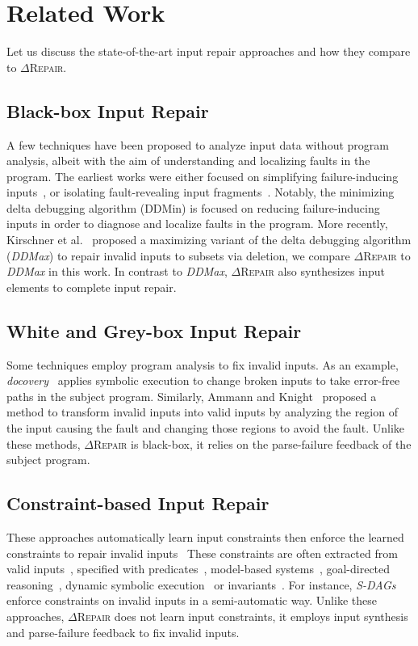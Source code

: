 \documentclass[acmsmall,screen,review,anonymous]{acmart}
\newcommand{\ddmin}{\textit{ddmin}\xspace}
\newcommand{\approach}{\textsc{$\Delta$Repair}\xspace}
\def\ddmin{DDMin\xspace}
\newcommand{\ddmax}{\textit{DDMax}\xspace}
\begin{document}
\section{Related Work}
\label{sec:relatedwork}

Let us discuss the state-of-the-art input repair approaches and how they compare to \approach. 

\subsection{Black-box Input Repair} 
A few techniques have been proposed to analyze input data without program analysis, albeit with the aim of understanding and localizing faults in the program. The earliest works were either focused on simplifying failure-inducing inputs~\cite{zeller2002simplifying, clause2009penumbra}, or isolating fault-revealing input fragments~\cite{hierarchicalDD, sterling2007automated}. Notably, the minimizing delta debugging algorithm (\ddmin) is focused on reducing failure-inducing inputs in order to diagnose and localize faults in the program. More recently, Kirschner et al.~\cite{kirschner2020debugging} proposed a maximizing variant of the delta debugging algorithm (\ddmax) to repair invalid inputs to subsets via deletion, we compare \approach to \ddmax in this work. In contrast to \ddmax, \approach also synthesizes input elements to complete input repair. 


\subsection{White and Grey-box Input Repair} Some techniques employ program analysis to fix invalid inputs. As an example, \emph{docovery}~\cite{docovery:ase14} applies symbolic execution to change broken inputs to take error-free paths in the subject program. Similarly, Ammann and Knight~\cite{data_diversity} proposed a method to transform invalid inputs into valid inputs by analyzing the region of the input causing the fault and changing those regions to avoid the fault. Unlike these methods, \approach 
is black-box, it relies on the parse-failure feedback of the subject program. 


\subsection{Constraint-based Input Repair} %
These approaches automatically learn input constraints then enforce the learned constraints to repair invalid inputs~\cite{hussain2010dynamic, Demsky:2006:IED:1146238.1146266} 
These constraints are often extracted from valid inputs~\cite{Long:2012:AIR:2337223.2337233, Rinard:2007:LCZ:1297027.1297072}, specified with predicates~\cite{elkarablieh2008juzi}, model-based systems~\cite{Demsky:2003:ADR:949343.949314}, goal-directed reasoning~\cite{1553560}, dynamic symbolic execution~\cite{hussain2010dynamic} or invariants~\cite{Demsky:2006:IED:1146238.1146266}. For instance, \emph{S-DAGs}~\cite{scheffczyk2004s} enforce constraints on invalid inputs in a semi-automatic way. Unlike these approaches, \approach does not learn input constraints, it employs input synthesis and parse-failure feedback to fix invalid inputs. 
\end{document}
